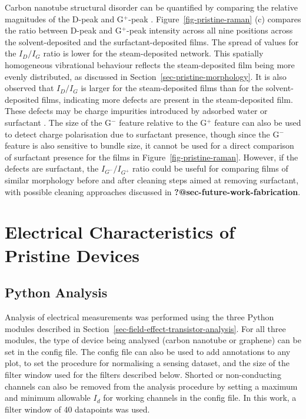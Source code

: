 \documentclass[
  a4paper,
]{scrbook}
\begin{document}
Carbon nanotube structural disorder can be quantified by comparing the
relative magnitudes of the D-peak and G\(^+\)-peak
\autocite{Dresselhaus2005,King2014}. Figure~\ref{fig-pristine-raman} (c)
compares the ratio between D-peak and G\(^+\)-peak intensity across all
nine positions across the solvent-deposited and the surfactant-deposited
films. The spread of values for the \(I_D/I_G\) ratio is lower for the
steam-deposited network. This spatially homogeneous vibrational
behaviour reflects the steam-deposited film being more evenly
distributed, as discussed in Section~\ref{sec-pristine-morphology}. It
is also observed that \(I_D/I_G\) is larger for the steam-deposited
films than for the solvent-deposited films, indicating more defects are
present in the steam-deposited film. These defects may be charge
impurities introduced by adsorbed water or surfactant
\autocite{Christensen2022}. The size of the G\(^-\) feature relative to
the G\(^+\) feature can also be used to detect charge polarisation due
to surfactant presence, though since the G\(^-\) feature is also
sensitive to bundle size, it cannot be used for a direct comparison of
surfactant presence for the films in Figure~\ref{fig-pristine-raman}.
However, if the defects are surfactant, the \(I_{G^-}/I_{G^+}\) ratio
could be useful for comparing films of similar morphology before and
after cleaning steps aimed at removing surfactant, with possible
cleaning approaches discussed in \textbf{?@sec-future-work-fabrication}.

\hypertarget{sec-pristine-electrical-characterisation}{%
\section{Electrical Characteristics of Pristine
Devices}\label{sec-pristine-electrical-characterisation}}

\hypertarget{sec-python-analysis}{%
\subsection{Python Analysis}\label{sec-python-analysis}}

Analysis of electrical measurements was performed using the three Python
modules described in Section~\ref{sec-field-effect-transistor-analysis}.
For all three modules, the type of device being analysed (carbon
nanotube or graphene) can be set in the config file. The config file can
also be used to add annotations to any plot, to set the procedure for
normalising a sensing dataset, and the size of the filter window used
for the filters described below. Shorted or non-conducting channels can
also be removed from the analysis procedure by setting a maximum and
minimum allowable \(I_d\) for working channels in the config file. In
this work, a filter window of 40 datapoints was used.
\end{document}
